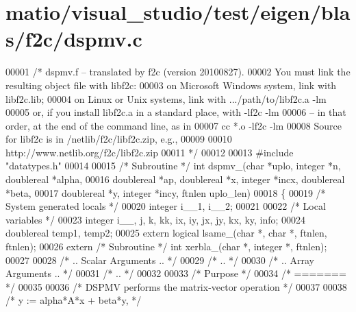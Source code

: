 \hypertarget{matio_2visual__studio_2test_2eigen_2blas_2f2c_2dspmv_8c_source}{}\section{matio/visual\+\_\+studio/test/eigen/blas/f2c/dspmv.c}
\label{matio_2visual__studio_2test_2eigen_2blas_2f2c_2dspmv_8c_source}

\begin{DoxyCode}
00001 \textcolor{comment}{/* dspmv.f -- translated by f2c (version 20100827).}
00002 \textcolor{comment}{   You must link the resulting object file with libf2c:}
00003 \textcolor{comment}{    on Microsoft Windows system, link with libf2c.lib;}
00004 \textcolor{comment}{    on Linux or Unix systems, link with .../path/to/libf2c.a -lm}
00005 \textcolor{comment}{    or, if you install libf2c.a in a standard place, with -lf2c -lm}
00006 \textcolor{comment}{    -- in that order, at the end of the command line, as in}
00007 \textcolor{comment}{        cc *.o -lf2c -lm}
00008 \textcolor{comment}{    Source for libf2c is in /netlib/f2c/libf2c.zip, e.g.,}
00009 \textcolor{comment}{}
00010 \textcolor{comment}{        http://www.netlib.org/f2c/libf2c.zip}
00011 \textcolor{comment}{*/}
00012 
00013 \textcolor{preprocessor}{#include "datatypes.h"}
00014 
00015 \textcolor{comment}{/* Subroutine */} \textcolor{keywordtype}{int} dspmv\_(\textcolor{keywordtype}{char} *uplo, integer *n, doublereal *alpha, 
00016     doublereal *ap, doublereal *x, integer *incx, doublereal *beta, 
00017     doublereal *y, integer *incy, ftnlen uplo\_len)
00018 \{
00019     \textcolor{comment}{/* System generated locals */}
00020     integer i\_\_1, i\_\_2;
00021 
00022     \textcolor{comment}{/* Local variables */}
00023     integer i\_\_, j, k, kk, ix, iy, jx, jy, kx, ky, info;
00024     doublereal temp1, temp2;
00025     \textcolor{keyword}{extern} logical lsame\_(\textcolor{keywordtype}{char} *, \textcolor{keywordtype}{char} *, ftnlen, ftnlen);
00026     \textcolor{keyword}{extern} \textcolor{comment}{/* Subroutine */} \textcolor{keywordtype}{int} xerbla\_(\textcolor{keywordtype}{char} *, integer *, ftnlen);
00027 
00028 \textcolor{comment}{/*     .. Scalar Arguments .. */}
00029 \textcolor{comment}{/*     .. */}
00030 \textcolor{comment}{/*     .. Array Arguments .. */}
00031 \textcolor{comment}{/*     .. */}
00032 
00033 \textcolor{comment}{/*  Purpose */}
00034 \textcolor{comment}{/*  ======= */}
00035 
00036 \textcolor{comment}{/*  DSPMV  performs the matrix-vector operation */}
00037 
00038 \textcolor{comment}{/*     y := alpha*A*x + beta*y, */}

\end{DoxyCode}

